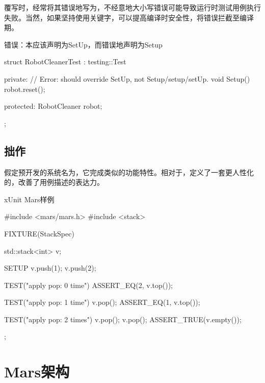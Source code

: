 \begin{content}
覆写时，经常将其错误地写为，不经意地大小写错误可能导致运行时测试用例执行失败。当然，如果坚持使用关键字，可以提高编译时安全性，将错误拦截至编译期。

\begin{nodiff}{错误：本应该声明为SetUp，而错误地声明为Setup}
 \begin{c++}
struct RobotCleanerTest : testing::Test {
private:
  // Error: should override SetUp, not Setup/setup/setUp.
  void Setup() {
    robot.reset();
  }
 
protected:
  RobotCleaner robot;
};
  \end{c++}
\end{nodiff}

\subsection{拙作}

假定预开发的系统名为，它完成类似的功能特性。相对于，定义了一套更人性化的，改善了用例描述的表达力。

\begin{enum}
\end{enum}

\begin{nodiff}{xUnit Mars样例}
 \begin{c++}
#include <mars/mars.h>
#include <stack>

FIXTURE(StackSpec) {
  std::stack<int> v;   

  SETUP {
    v.push(1);
    v.push(2);
  }

  TEST("apply pop: 0 time") {
    ASSERT_EQ(2, v.top());
  }

  TEST("apply pop: 1 time") {
    v.pop();
    ASSERT_EQ(1, v.top());
  }

  TEST("apply pop: 2 times") {
    v.pop();
    v.pop();
    ASSERT_TRUE(v.empty());
  }
}; 
 \end{c++}
\end{nodiff}

\end{content}

\section{Mars架构}
	
